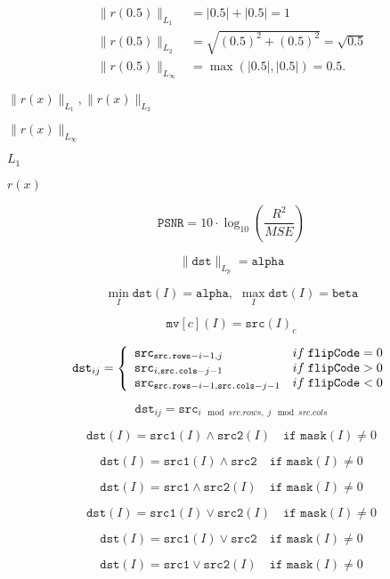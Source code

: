 \documentclass{article}
\begin{document}
\begin{align*} \| r(0.5) \|_{L_1} &= |0.5| + |0.5| = 1 \\ \| r(0.5) \|_{L_2} &= \sqrt{(0.5)^{2} + (0.5)^{2}} = \sqrt{0.5} \\ \| r(0.5) \|_{L_\infty} &= \max(|0.5|,|0.5|) = 0.5. \end{align*}
\pagebreak

$\| r(x) \|_{L_1}, \| r(x) \|_{L_2}$
\pagebreak

$\| r(x) \|_{L_\infty}$
\pagebreak

$ L_{1} $
\pagebreak

$ r(x) $
\pagebreak

\[ \texttt{PSNR} = 10 \cdot \log_{10}{\left( \frac{R^2}{MSE} \right) } \]
\pagebreak

\[\| \texttt{dst} \| _{L_p}= \texttt{alpha}\]
\pagebreak

\[\min _I \texttt{dst} (I)= \texttt{alpha} , \, \, \max _I \texttt{dst} (I)= \texttt{beta}\]
\pagebreak

\[\texttt{mv} [c](I) = \texttt{src} (I)_c\]
\pagebreak

\[\texttt{dst} _{ij} = \left\{ \begin{array}{l l} \texttt{src} _{\texttt{src.rows}-i-1,j} & if\; \texttt{flipCode} = 0 \\ \texttt{src} _{i, \texttt{src.cols} -j-1} & if\; \texttt{flipCode} > 0 \\ \texttt{src} _{ \texttt{src.rows} -i-1, \texttt{src.cols} -j-1} & if\; \texttt{flipCode} < 0 \\ \end{array} \right.\]
\pagebreak

\[\texttt{dst} _{ij}= \texttt{src} _{i\mod src.rows, \; j\mod src.cols }\]
\pagebreak

\[\texttt{dst} (I) = \texttt{src1} (I) \wedge \texttt{src2} (I) \quad \texttt{if mask} (I) \ne0\]
\pagebreak

\[\texttt{dst} (I) = \texttt{src1} (I) \wedge \texttt{src2} \quad \texttt{if mask} (I) \ne0\]
\pagebreak

\[\texttt{dst} (I) = \texttt{src1} \wedge \texttt{src2} (I) \quad \texttt{if mask} (I) \ne0\]
\pagebreak

\[\texttt{dst} (I) = \texttt{src1} (I) \vee \texttt{src2} (I) \quad \texttt{if mask} (I) \ne0\]
\pagebreak

\[\texttt{dst} (I) = \texttt{src1} (I) \vee \texttt{src2} \quad \texttt{if mask} (I) \ne0\]
\pagebreak

\[\texttt{dst} (I) = \texttt{src1} \vee \texttt{src2} (I) \quad \texttt{if mask} (I) \ne0\]
\pagebreak
\end{document}
